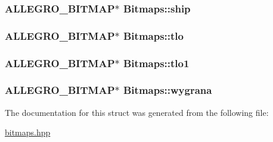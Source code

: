\subsubsection[{\texorpdfstring{ship}{ship}}]{\setlength{\rightskip}{0pt plus 5cm}A\+L\+L\+E\+G\+R\+O\+\_\+\+B\+I\+T\+M\+AP$\ast$ Bitmaps\+::ship}\hypertarget{struct_bitmaps_a6a15fc60fea8423a96f927b0730ee7fe}{}\label{struct_bitmaps_a6a15fc60fea8423a96f927b0730ee7fe}
\subsubsection[{\texorpdfstring{tlo}{tlo}}]{\setlength{\rightskip}{0pt plus 5cm}A\+L\+L\+E\+G\+R\+O\+\_\+\+B\+I\+T\+M\+AP$\ast$ Bitmaps\+::tlo}\hypertarget{struct_bitmaps_ad75c5906de7630960be96318a9ec8322}{}\label{struct_bitmaps_ad75c5906de7630960be96318a9ec8322}
\subsubsection[{\texorpdfstring{tlo1}{tlo1}}]{\setlength{\rightskip}{0pt plus 5cm}A\+L\+L\+E\+G\+R\+O\+\_\+\+B\+I\+T\+M\+AP$\ast$ Bitmaps\+::tlo1}\hypertarget{struct_bitmaps_aac910c3498ee3aae8349b455ad85b765}{}\label{struct_bitmaps_aac910c3498ee3aae8349b455ad85b765}
\subsubsection[{\texorpdfstring{wygrana}{wygrana}}]{\setlength{\rightskip}{0pt plus 5cm}A\+L\+L\+E\+G\+R\+O\+\_\+\+B\+I\+T\+M\+AP$\ast$ Bitmaps\+::wygrana}\hypertarget{struct_bitmaps_a6fe9a8656cec2a659f6b4882d2ee4b2d}{}\label{struct_bitmaps_a6fe9a8656cec2a659f6b4882d2ee4b2d}


The documentation for this struct was generated from the following file\+:\begin{DoxyCompactItemize}
\item 
\hyperlink{bitmaps_8hpp}{bitmaps.\+hpp}\end{DoxyCompactItemize}
